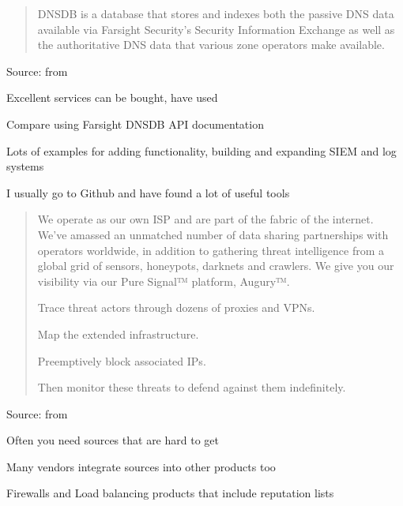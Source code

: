 \documentclass[Screen16to9,17pt]{foils}
\begin{document}
\begin{list2}
\item
\end{list2}




\begin{quote}
DNSDB is a database that stores and indexes both the passive DNS data available via Farsight Security’s Security Information Exchange as well as the authoritative DNS data that various zone operators make available.
\end{quote}
Source: from 
\begin{list2}
  \item Excellent services can be bought, have used 
\item Compare using 
  Farsight DNSDB API documentation
\item {}
\item Lots of examples for adding functionality, building and expanding SIEM and log systems
\item I usually go to Github and have found a lot of useful tools
\end{list2}



\begin{quote}
  We operate as our own ISP and are part of the fabric of the internet. We’ve amassed an unmatched number of data sharing partnerships with operators worldwide, in addition to gathering threat intelligence from a global grid of sensors, honeypots, darknets and crawlers. We give you our visibility via our Pure Signal™ platform, Augury™.

\begin{list2}
\item Trace threat actors through dozens of proxies and VPNs.
\item Map the extended infrastructure.
\item Preemptively block associated IPs.
\item Then monitor these threats to defend against them indefinitely.
\end{list2}
\end{quote}
Source: from 

\begin{list2}
\item Often you need sources that are hard to get
\item Many vendors integrate sources into other products too
\item Firewalls and Load balancing products that include reputation lists
\end{list2}
\end{document}
